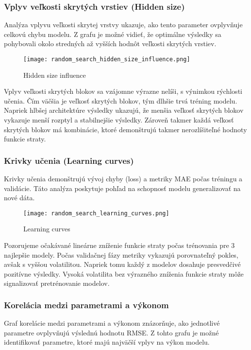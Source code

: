 \newpage

\subsubsection{Vplyv veľkosti skrytých vrstiev (Hidden size)}
Analýza vplyvu veľkosti skrytej vrstvy ukazuje, ako tento parameter ovplyvňuje celkovú chybu modelu. Z grafu je možné vidieť, že optimálne výsledky sa pohybovali okolo stredných až vyšších hodnôt veľkosti skrytých vrstiev.

\begin{figure}[ht!]
\centering
\texttt{[image: random\_search\_hidden\_size\_influence.png]}
\caption{Hidden size influence}
\label{fig:random_search_hidden_size_influence}
\end{figure}

Vplyv veľkosti skrytých blokov sa vzájomne výrazne nelíši, s výnimkou rýchlosti učenia. Čím väčšia je veľkosť skrytých blokov, tým dlhšie trvá tréning modelu. Napriek hlbšej architektúre výsledky ukazujú, že menšia veľkosť skrytých blokov vykazuje menší rozptyl a stabilnejšie výsledky. Zároveň takmer každá veľkosť skrytých blokov má kombinácie, ktoré demonštrujú takmer nerozlíšiteľné hodnoty funkcie straty.

\newpage

\subsubsection{Krivky učenia (Learning curves)}
Krivky učenia demonštrujú vývoj chyby (loss) a metriky MAE počas tréningu a validácie. Táto analýza poskytuje pohľad na schopnosť modelu generalizovať na nové dáta.

\begin{figure}[ht!]
\centering
\texttt{[image: random\_search\_learning\_curves.png]}
\caption{Learning curves}
\label{fig:random_search_learning_curves}
\end{figure}

Pozorujeme očakávané lineárne zníženie funkcie straty počas trénovania pre 3 najlepšie modely. Počas validačnej fázy metriky vykazujú porovnateľný pokles, avšak s vyššou volatilitou. Napriek tomu každý z modelov dosahuje presvedčivé pozitívne výsledky. Vysoká volatilita bez výrazného zníženia funkcie straty môže signalizovať pretrénovanie modelov.

\newpage

\subsubsection{Korelácia medzi parametrami a výkonom}
Graf korelácie medzi parametrami a výkonom znázorňuje, ako jednotlivé parametre ovplyvňujú výslednú hodnotu RMSE. Z tohto grafu je možné identifikovať parametre, ktoré majú najväčší vplyv na výkon modelu.

